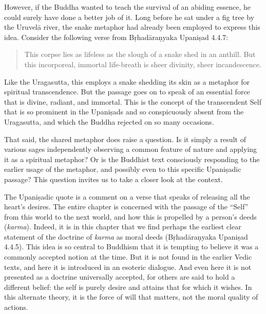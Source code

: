 \documentclass[12pt,openany]{book}%
\begin{document}
However, if the Buddha wanted to teach the survival of an abiding essence, he could surely have done a better job of it. Long before he sat under a fig tree by the \textsanskrit{Uruvelā} river, the snake metaphor had already been employed to express this idea. Consider the following verse from \textsanskrit{Bṛhadāraṇyaka} \textsanskrit{Upaniṣad} 4.4.7:

\begin{quotation}%
This corpse lies as lifeless as the slough of a snake shed in an anthill. But this incorporeal, immortal life-breath is sheer divinity, sheer incandescence.

%
\end{quotation}

Like the Uragasutta, this employs a snake shedding its skin as a metaphor for spiritual transcendence. But the passage goes on to speak of an essential force that is divine, radiant, and immortal. This is the concept of the transcendent Self that is so prominent in the \textsanskrit{Upaniṣads} and so conspicuously absent from the Uragasutta, and which the Buddha rejected on so many occasions.

That said, the shared metaphor does raise a question. Is it simply a result of various sages independently observing a common feature of nature and applying it as a spiritual metaphor? Or is the Buddhist text consciously responding to the earlier usage of the metaphor, and possibly even to this specific \textsanskrit{Upaniṣadic} passage? This question invites us to take a closer look at the context.

The \textsanskrit{Upaniṣadic} quote is a comment on a verse that speaks of releasing all the heart’s desires. The entire chapter is concerned with the passage of the “Self” from this world to the next world, and how this is propelled by a person’s deeds (\textit{karma}). Indeed, it is in this chapter that we find perhaps the earliest clear statement of the doctrine of \textit{karma} as moral deeds (\textsanskrit{Bṛhadāraṇyaka} \textsanskrit{Upaniṣad} 4.4.5). This idea is so central to Buddhism that it is tempting to believe it was a commonly accepted notion at the time. But it is not found in the earlier Vedic texts, and here it is introduced in an esoteric dialogue. And even here it is not presented as a doctrine universally accepted, for others are said to hold a different belief: the self is purely desire and attains that for which it wishes. In this alternate theory, it is the force of will that matters, not the moral quality of actions.
\end{document}
